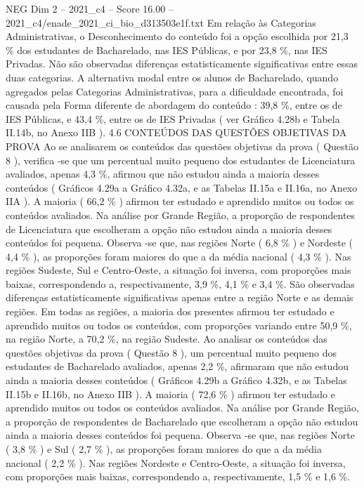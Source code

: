 \begin{textsample}{NEG Dim 2 – 2021\_c4 – Score 16.00 – 2021\_c4/enade\_2021\_ci\_bio\_d313503e1f.txt}
Em relação às Categorias Administrativas, o Desconhecimento do conteúdo foi a opção escolhida por 21,3 \% dos estudantes de Bacharelado, nas IES Públicas, e por 23,8 \%, nas IES Privadas.
Não são observadas diferenças estatisticamente significativas entre essas duas categorias.
A alternativa modal entre os alunos de Bacharelado, quando agregados pelas Categorias Administrativas, para a dificuldade encontrada, foi causada pela Forma diferente de abordagem do conteúdo : 39,8 \%, entre os de IES Públicas, e 43,4 \%, entre os de IES Privadas ( ver Gráfico 4.28b e Tabela II.14b, no Anexo IIB ). 4.6 CONTEÚDOS DAS QUESTÕES OBJETIVAS DA PROVA Ao se analisarem os conteúdos das questões objetivas da prova ( Questão 8 ), verifica -se que um percentual muito pequeno dos estudantes de Licenciatura avaliados, apenas 4,3 \%, afirmou que não estudou ainda a maioria desses conteúdos ( Gráficos 4.29a a Gráfico 4.32a, e as Tabelas II.15a e II.16a, no Anexo IIA ).
A maioria ( 66,2 \% ) afirmou ter estudado e aprendido muitos ou todos os conteúdos avaliados.
Na análise por Grande Região, a proporção de respondentes de Licenciatura que escolheram a opção não estudou ainda a maioria desses conteúdos foi pequena.
Observa -se que, nas regiões Norte ( 6,8 \% ) e Nordeste ( 4,4 \% ), as proporções foram maiores do que a da média nacional ( 4,3 \% ).
Nas regiões Sudeste, Sul e Centro-Oeste, a situação foi inversa, com proporções mais baixas, correspondendo a, respectivamente, 3,9 \%, 4,1 \% e 3,4 \%.
São observadas diferenças estatisticamente significativas apenas entre a região Norte e as demais regiões.
Em todas as regiões, a maioria dos presentes afirmou ter estudado e aprendido muitos ou todos os conteúdos, com proporções variando entre 50,9 \%, na região Norte, a 70,2 \%, na região Sudeste.
Ao analisar os conteúdos das questões objetivas da prova ( Questão 8 ), um percentual muito pequeno dos estudantes de Bacharelado avaliados, apenas 2,2 \%, afirmaram que não estudou ainda a maioria desses conteúdos ( Gráficos 4.29b a Gráfico 4.32b, e as Tabelas II.15b e II.16b, no Anexo IIB ).
A maioria ( 72,6 \% ) afirmou ter estudado e aprendido muitos ou todos os conteúdos avaliados.
Na análise por Grande Região, a proporção de respondentes de Bacharelado que escolheram a opção não estudou ainda a maioria desses conteúdos foi pequena.
Observa -se que, nas regiões Norte ( 3,8 \% ) e Sul ( 2,7 \% ), as proporções foram maiores do que a da média nacional ( 2,2 \% ).
Nas regiões Nordeste e Centro-Oeste, a situação foi inversa, com proporções mais baixas, correspondendo a, respectivamente, 1,5 \% e 1,6 \%.

\end{textsample}
